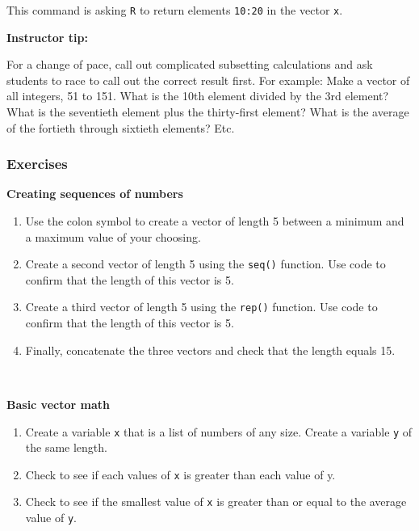 \documentclass[]{book}
\begin{document}
This command is asking \texttt{R} to return elements \texttt{10:20} in the vector \texttt{x}.

\leavevmode\hypertarget{tip-text}{}%
\textbf{Instructor tip:}

For a change of pace, call out complicated subsetting calculations and ask students to race to call out the correct result first. For example: Make a vector of all integers, 51 to 151. What is the 10th element divided by the 3rd element? What is the seventieth element plus the thirty-first element? What is the average of the fortieth through sixtieth elements? Etc.

\hypertarget{exercises-3}{%
\subsubsection*{Exercises}\label{exercises-3}}

\textbf{Creating sequences of numbers}

\begin{enumerate}
\def\labelenumi{\arabic{enumi}.}
\item
  Use the colon symbol to create a vector of length 5 between a minimum and a maximum value of your choosing.
\item
  Create a second vector of length 5 using the \texttt{seq()} function. Use code to confirm that the length of this vector is 5.
\item
  Create a third vector of length 5 using the \texttt{rep()} function. Use code to confirm that the length of this vector is 5.
\item
  Finally, concatenate the three vectors and check that the length equals 15.
\end{enumerate}

~

\textbf{Basic vector math}

\begin{enumerate}
\def\labelenumi{\arabic{enumi}.}
\setcounter{enumi}{4}
\item
  Create a variable \texttt{x} that is a list of numbers of any size. Create a variable \texttt{y} of the same length.
\item
  Check to see if each values of \texttt{x} is greater than each value of y.
\item
  Check to see if the smallest value of \texttt{x} is greater than or equal to the average value of \texttt{y}.
\end{enumerate}
\end{document}
